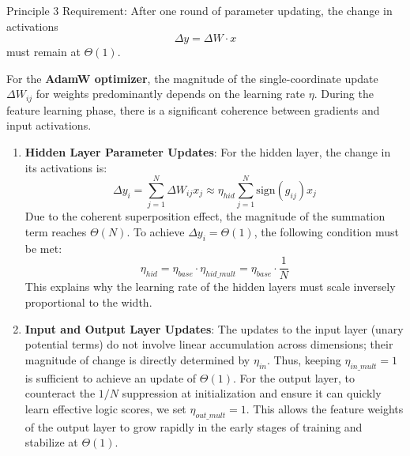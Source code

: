 \documentclass[11pt]{article}
\begin{document}
Principle 3 Requirement: After one round of parameter updating, the change in activations
\begin{equation}
    \Delta y = \Delta W \cdot x
\end{equation}
must remain at $\Theta(1)$.

For the \textbf{AdamW optimizer}, the magnitude of the single-coordinate update $\Delta W_{ij}$ for weights predominantly depends on the learning rate $\eta$. During the feature learning phase, there is a significant coherence between gradients and input activations.

\begin{enumerate}
    \item \textbf{Hidden Layer Parameter Updates}: For the hidden layer, the change in its activations is:
    \begin{equation}
    \Delta y_i = \sum_{j=1}^N \Delta W_{ij} x_j \approx \eta_{hid} \sum_{j=1}^N \text{sign}(g_{ij}) x_j
    \end{equation}
    Due to the coherent superposition effect, the magnitude of the summation term reaches $\Theta(N)$. To achieve $\Delta y_i = \Theta(1)$, the following condition must be met:
    \begin{equation}
    \eta_{hid} = \eta_{base} \cdot \eta_{hid\_mult} = \eta_{base} \cdot \frac{1}{N}
    \end{equation}
    This explains why the learning rate of the hidden layers must scale inversely proportional to the width.

    \item \textbf{Input and Output Layer Updates}: The updates to the input layer (unary potential terms) do not involve linear accumulation across dimensions; their magnitude of change is directly determined by $\eta_{in}$. Thus, keeping $\eta_{in\_mult} = 1$ is sufficient to achieve an update of $\Theta(1)$. For the output layer, to counteract the $1/N$ suppression at initialization and ensure it can quickly learn effective logic scores, we set $\eta_{out\_mult} = 1$. This allows the feature weights of the output layer to grow rapidly in the early stages of training and stabilize at $\Theta(1)$.
\end{enumerate}
\end{document}
